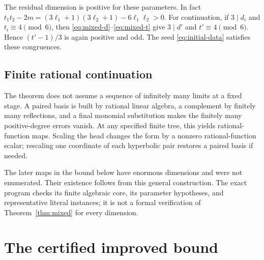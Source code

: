 \documentclass[11pt]{article}
\theoremstyle{definition}\newtheorem{definition}[theorem]{Definition}
\theoremstyle{remark}\newtheorem{remark}[theorem]{Remark}
\begin{document}
The residual dimension is positive for these parameters. In fact $t_1t_2-2m=(3\ell_1+1)(3\ell_2+1)-6\ell_1\ell_2>0$. For continuation, if $3\mid d_i$ and $t_i\equiv4\pmod6$, then \eqref{eq:mixed-d}--\eqref{eq:mixed-t} give $3\mid d'$ and $t'\equiv4\pmod6$. Hence $(t'-1)/3$ is again positive and odd. The seed \eqref{eq:initial-data} satisfies these congruences.

\subsection{Finite rational continuation}

The theorem does not assume a sequence of infinitely many limits at a fixed stage. A paired basis is built by rational linear algebra, a complement by finitely many reflections, and a final monomial substitution makes the finitely many positive-degree errors vanish. At any specified finite tree, this yields rational-function maps. Scaling the head changes the form by a nonzero rational-function scalar; rescaling one coordinate of each hyperbolic pair restores a paired basis if needed.

The later maps in the bound below have enormous dimensions and were not enumerated. Their existence follows from this general construction. The exact program checks its finite algebraic core, its parameter hypotheses, and representative literal instances; it is not a formal verification of Theorem~\ref{thm:mixed} for every dimension.

\section{The certified improved bound}\label{sec:bound}
\end{document}
